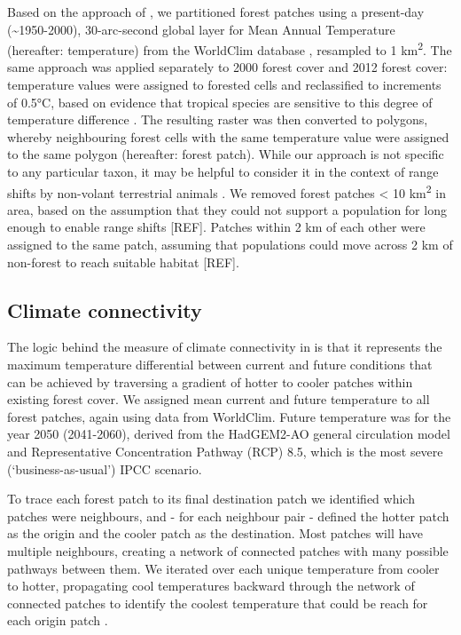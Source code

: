 \documentclass[12pt,a4paper,]{report}
\theoremstyle{definition}
\theoremstyle{definition}
\theoremstyle{definition}
\theoremstyle{remark}
\begin{document}
Based on the approach of \citet{mcguire_achieving_2016}, we partitioned
forest patches using a present-day (\textasciitilde{}1950-2000),
30-arc-second global layer for Mean Annual Temperature (hereafter:
temperature) from the WorldClim database \citep[Version
1.4;][]{hijmans_very_2005}, resampled to 1 km\textsuperscript{2}. The
same approach was applied separately to 2000 forest cover and 2012
forest cover: temperature values were assigned to forested cells and
reclassified to increments of 0.5°C, based on evidence that tropical
species are sensitive to this degree of temperature difference
\citep[e.g.][]{peh_potential_2007, freeman_rapid_2014, raxworthy_extinction_2008}.
The resulting raster was then converted to polygons, whereby
neighbouring forest cells with the same temperature value were assigned
to the same polygon (hereafter: forest patch). While our approach is not
specific to any particular taxon, it may be helpful to consider it in
the context of range shifts by non-volant terrestrial animals
\citep[cf.][]{nunez_connectivity_2013}. We removed forest patches
\textless{} 10 km\textsuperscript{2} in area, based on the assumption
that they could not support a population for long enough to enable range
shifts {[}REF{]}. Patches within 2 km of each other were assigned to the
same patch, assuming that populations could move across 2 km of
non-forest to reach suitable habitat {[}REF{]}.

\subsection{Climate connectivity}\label{climate-connectivity}

The logic behind the measure of climate connectivity in
\citet{mcguire_achieving_2016} is that it represents the maximum
temperature differential between current and future conditions that can
be achieved by traversing a gradient of hotter to cooler patches within
existing forest cover. We assigned mean current and future temperature
to all forest patches, again using data from WorldClim. Future
temperature was for the year 2050 (2041-2060), derived from the
HadGEM2-AO general circulation model \citep{ipcc_climate_2013} and
Representative Concentration Pathway (RCP) 8.5, which is the most severe
(`business-as-usual') IPCC scenario.

To trace each forest patch to its final destination patch we identified
which patches were neighbours, and - for each neighbour pair - defined
the hotter patch as the origin and the cooler patch as the destination.
Most patches will have multiple neighbours, creating a network of
connected patches with many possible pathways between them. We iterated
over each unique temperature from cooler to hotter, propagating cool
temperatures backward through the network of connected patches to
identify the coolest temperature that could be reach for each origin
patch \citep[see Supplementary Text 1 for a worked
example;][]{mcguire_achieving_2016}.
\end{document}
